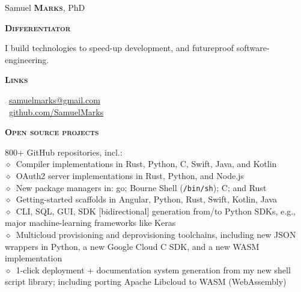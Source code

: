 \documentclass[11pt, a4paper]{article}
\newcommand{\smaller}[1]{{\small$\diamond$\ #1}}
\newcommand{\headleft}[1]{\vspace*{3ex}\textsc{\textbf{#1}}\par%
    \vspace*{-1.5ex}\hrulefill\par\vspace*{0.7ex}}
\begin{document}
\begin{minipage}[t]{0.33\textwidth} %
\colorbox{cvblue}{\begin{minipage}[t][5mm][t]{\textwidth}\null\hfill\null\end{minipage}}

\vspace{-.2ex} %
\colorbox{cvblue!90}{\color{white}  %
\textwidth\relax%
\begin{minipage}[t][293mm][t]{0.82\textwidth}
\raggedright
\vspace*{2.5ex}

\Large Samuel \textbf{\textsc{Marks}}, PhD \normalsize 


\vspace*{0.5ex} %

\headleft{Differentiator}
I build technologies to speed-up development, and futureproof software-engineering.

\headleft{Links}
\small %
\MVAt\ \href{mailto://samuelmarks@gmail.com}{\small samuelmarks@gmail.com} \\[0.4ex]
\Mundus\ \href{https://github.com/SamuelMarks}{github.com/SamuelMarks} \\[0.1ex]
\normalsize

\headleft{Open source projects}
800+ GitHub repositories, incl.:\\
\smaller{Compiler implementations in Rust, Python, C, Swift, Java, and Kotlin}\\
\smaller{OAuth2 server implementations in Rust, Python, and Node.js}\\
\smaller{New package managers in: go; Bourne Shell (\texttt{/bin/sh}); C; and Rust}\\
\smaller{Getting-started scaffolds in Angular, Python, Rust, Swift, Kotlin, Java}\\
\smaller{\textbraceleft{}CLI, SQL, GUI, SDK\textbraceright{} [bidirectional] generation from/to Python SDKs, e.g., major machine-learning frameworks like Keras}\\
\smaller{Multicloud provisioning and deprovisioning toolchains, including new JSON wrappers in Python, a new Google Cloud C SDK, and a new WASM implementation}\\
\smaller{1-click deployment + documentation system generation from my new shell script library; including porting Apache Libcloud to WASM (WebAssembly)}

\end{minipage}%
\textwidth\relax%
}
\end{minipage}%
\end{document}
